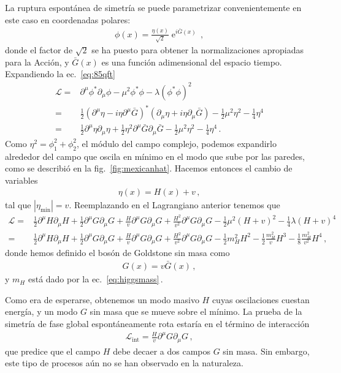 \begin{frame}
La ruptura espontánea de simetría se puede parametrizar convenientemente en este caso en coordenadas polares:
\begin{align}
  \phi(x)=\frac{\eta(x)}{\sqrt{2}} \operatorname{e}^{i\bar{G}(x)}\,,
\end{align}
donde el factor de $\sqrt{2}$ se ha puesto para obtener la normalizaciones apropiadas para la Acción, y $\bar{G}(x)$ es una función adimensional del espacio tiempo. Expandiendo la ec.~\eqref{eq:85qft}
\begin{align}
    \mathcal{L}=&\partial^\mu\phi^*\partial_\mu\phi-\mu^2\phi^*\phi-\lambda(\phi^*\phi)^2 \nonumber\\
=&\frac{1}{2}\left( \partial^{\mu}\eta-i\eta \partial^{\mu}\bar{G} \right)^{*}\left(\partial_{\mu}\eta+i\eta \partial_{\mu}\bar{G}  \right)
-\frac{1}{2}\mu^2 \eta^2 -\frac{1}{4}\eta^4 \nonumber\\
=&\frac{1}{2}\partial^{\mu}\eta\partial_{\mu}\eta+\frac{1}{2}\eta^2 \partial^{\mu}\bar{G}\partial_{\mu}\bar{G} 
-\frac{1}{2}\mu^2 \eta^2 -\frac{1}{4}\eta^4 \,.
\end{align}
 Como $\eta^2=\phi_1^2+\phi_2^2$, el módulo del campo complejo, podemos expandirlo  alrededor del campo que oscila en mínimo en el modo que sube por las paredes, como se describió en la fig.~\ref{fig:mexicanhat}. Hacemos entonces el cambio de variables
 \begin{align}
   \eta(x)=H(x)+v\,,
 \end{align}
tal que $|\eta_{\text{min}}|=v$. Reemplazando en el Lagrangiano anterior tenemos que
\begin{align}
  \mathcal{L}=&\frac{1}{2}\partial^{\mu}H\partial_{\mu}H+\frac{1}{2}\partial^{\mu}G\partial_{\mu}G+\frac{H}{v}\partial^{\mu}G\partial_{\mu}G+\frac{H^2}{v^2}\partial^{\mu}G\partial_{\mu}G
-\tfrac{1}{2}\mu^2(H+v)^2-\tfrac{1}{4}\lambda(H+v)^4 \nonumber\\
=&  \frac{1}{2}\partial^{\mu}H\partial_{\mu}H+\frac{1}{2}\partial^{\mu}G\partial_{\mu}G+\frac{H}{v}\partial^{\mu}G\partial_{\mu}G+\frac{H^2}{v^2}\partial^{\mu}G\partial_{\mu}G-\frac{1}{2}m_H^2H^2-\frac{1}{2}\frac{m_H^2}{v}H^3-\frac{1}{8}\frac{m_H^2}{v^2} H^4\,,
\end{align}
donde hemos definido el bosón de Goldstone sin masa como
\begin{align}
  G(x)=v\bar{G}(x)\,,
\end{align}
y $m_H$ está dado por la ec.~\eqref{eq:higgsmass}\,.

Como era de esperarse, obtenemos un modo masivo $H$ cuyas oscilaciones cuestan energía, y un modo $G$ sin masa que se mueve sobre el mínimo. La prueba de la simetría de fase global espontáneamente rota estaría en el término de interacción
\begin{align}
  \mathcal{L}_{\text{int}}=\frac{H}{v}\partial^{\mu}G\partial_{\mu}G\,,
\end{align}
que predice que el campo $H$ debe decaer a dos campos $G$ sin masa. Sin embargo, este tipo de procesos aún no se han observado en la naturaleza. 
\end{frame}

